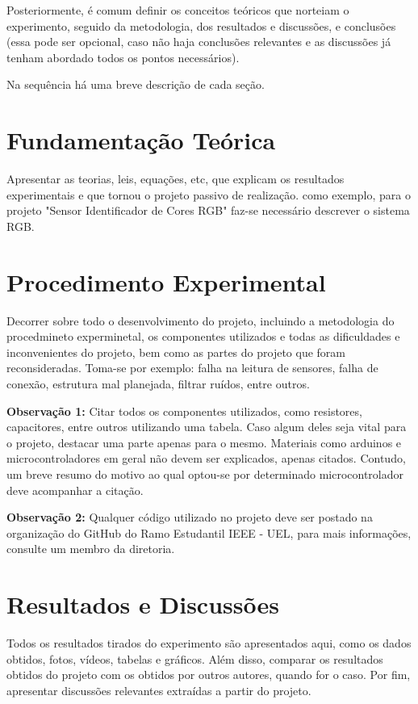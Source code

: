 \documentclass[a4paper,12pt]{article}
\begin{document}
Posteriormente, é comum definir os conceitos teóricos que norteiam o experimento, seguido da metodologia, dos resultados e discussões, e conclusões (essa pode ser opcional, caso não haja conclusões relevantes e as discussões já tenham abordado todos os pontos necessários).

Na sequência há uma breve descrição de cada seção.

\newpage
\section{Fundamentação Teórica}
\label{sec:teoria}
Apresentar as teorias, leis, equações, etc, que explicam os  resultados  experimentais e que tornou o projeto passivo de realização. como exemplo, para o projeto "Sensor Identificador de Cores RGB" faz-se necessário descrever o sistema RGB. 

\newpage
\section{Procedimento Experimental}
\label{sec:procedimento_experimental}
Decorrer sobre todo o desenvolvimento do projeto, incluindo a metodologia do procedmineto experminetal, os componentes utilizados e todas as dificuldades e inconvenientes do projeto, bem como as partes do projeto que foram reconsideradas. Toma-se por exemplo: falha na leitura de sensores, falha de conexão, estrutura mal planejada, filtrar ruídos, entre outros.

\textbf{Observação 1: } Citar todos os componentes utilizados, como resistores, capacitores, entre outros utilizando uma tabela. Caso algum deles seja vital para o projeto, destacar uma parte apenas para o mesmo. Materiais como arduinos e microcontroladores em geral não devem ser explicados, apenas citados. Contudo, um breve resumo do motivo ao qual optou-se por determinado microcontrolador deve acompanhar a citação.

\textbf{Observação 2: }Qualquer código utilizado no projeto deve ser postado na organização do GitHub do Ramo Estudantil IEEE - UEL, para mais informações, consulte um membro da diretoria.

\newpage
\section{Resultados e Discussões}
\label{sec:resultados}
Todos  os  resultados  tirados  do  experimento  são  apresentados  aqui,  como os dados obtidos, fotos, vídeos, tabelas e gráficos. Além disso, comparar os resultados obtidos do projeto com os obtidos por outros autores, quando for o caso. Por fim, apresentar discussões relevantes extraídas a partir do projeto.
\end{document}
